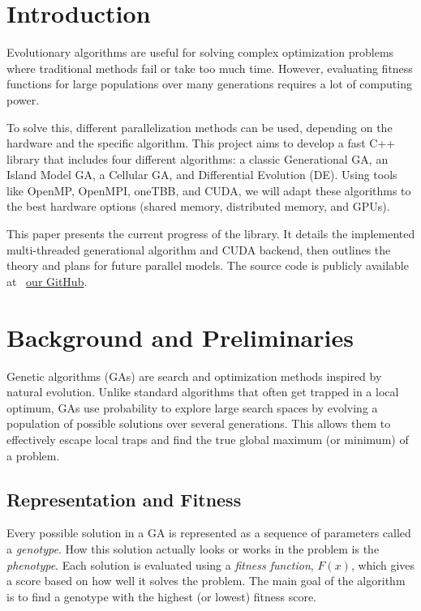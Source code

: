 \documentclass[conference]{IEEEtran}
\begin{document}
    \section{Introduction}
    Evolutionary algorithms are useful for solving complex optimization problems where traditional methods fail or take too much time. However, evaluating fitness functions for large populations over many generations requires a lot of computing power. 

    To solve this, different parallelization methods can be used, depending on the hardware and the specific algorithm. This project aims to develop a fast C++ library that includes four different algorithms: a classic Generational GA, an Island Model GA, a Cellular GA, and Differential Evolution (DE). Using tools like OpenMP, OpenMPI, oneTBB, and CUDA, we will adapt these algorithms to the best hardware options (shared memory, distributed memory, and GPUs). 

    This paper presents the current progress of the library. It details the implemented multi-threaded generational algorithm and CUDA backend, then outlines the theory and plans for future parallel models. The source code is publicly available at \faGithub\ \href{https://github.com/Martik-k/GALib-Parallel}{our GitHub}.

    \section{Background and Preliminaries}

    Genetic algorithms (GAs) are search and optimization methods inspired by natural evolution. Unlike standard algorithms that often get trapped in a local optimum, GAs use probability to explore large search spaces by evolving a population of possible solutions over several generations. This allows them to effectively escape local traps and find the true global maximum (or minimum) of a problem.

    \subsection{Representation and Fitness}
    Every possible solution in a GA is represented as a sequence of parameters called a \textit{genotype}. How this solution actually looks or works in the problem is the \textit{phenotype}. Each solution is evaluated using a \textit{fitness function}, $F(x)$, which gives a score based on how well it solves the problem. The main goal of the algorithm is to find a genotype with the highest (or lowest) fitness score.
\end{document}

